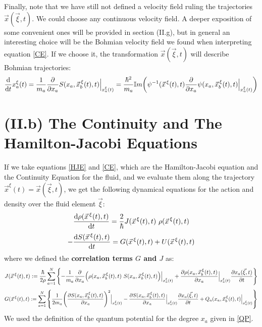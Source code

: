 \documentclass[11pt, a4paper]{article} %
\begin{document}
Finally, note that we have still not defined a velocity field ruling the trajectories $\vec{x}(\vec{\xi},t)$. We could choose any continuous velocity field. A deeper exposition of some convenient ones will be provided in section (II.g), but in general an interesting choice will be the Bohmian velocity field we found when interpreting equation \eqref{CE}. If we choose it, the transformation $\vec{x}(\vec{\xi},t)$ will describe Bohmian trajectories:
\begin{equation}\label{ImpBohm}
\dv{}{t}x_a^\xi(t)=\frac{1}{m_a}\pdv{}{x_a}S(x_a, \vec{x}_b^{\, \xi}(t),t)\Big\rvert_{x^\xi_a(t)}=\frac{\hbar^2}{m_a}\mathbb{I}m \qty( \psi^{-1}(\vec{x}^{\, \xi}(t),t)\pdv{}{x_a}\psi(x_a, \vec{x}_b^{\, \xi}(t),t)\Big\rvert_{x^\xi_a(t)})
\end{equation}

\newpage
\section*{(II.b) The Continuity and The Hamilton-Jacobi Equations\vspace{-0.3cm}}

If we take equations \eqref{HJE} and \eqref{CE}, which are the Hamilton-Jacobi equation and the Continuity Equation for the fluid, and we evaluate them along the trajectory $\vec{x}^\xi(t)=\vec{x}(\vec{\xi},t)$, we get the following dynamical equations for the action and density over the fluid element $\vec{\xi}$:
\begin{equation}\label{CE.L}
\dv{\rho(\vec{x}^{\, \xi}(t),t)}{t}=\frac{2}{\hbar}J(\vec{x}^{\, \xi}(t),t)\ \rho(\vec{x}^{\, \xi}(t),t)
\end{equation}
\begin{equation}\label{HJE.L}
-\dv{S(\vec{x}^{\, \xi}(t),t)}{t}=G(\vec{x}^{\, \xi}(t),t)+U(\vec{x}^{\, \xi}(t),t)
\end{equation}
where we defined the {\bf correlation terms $G$ and $J$} as:
\begin{equation}\label{JL}
J(\vec{x}^{\, \xi}(t),t):=\frac{\hbar}{2\rho}\sum_{a=1}^N\qty{-\frac{1}{m_a}\pdv{}{x_a}\qty(\rho(x_a, \vec{x}_b^{\, \xi}(t),t)\ S(x_a, \vec{x}_b^{\, \xi}(t),t))\Big\rvert_{x_a^\xi(t)}+\pdv{\rho(x_a, \vec{x}_b^{\, \xi}(t),t)}{x_a}\Big\rvert_{x_a^\xi(t)}\pdv{x_a(\vec{\xi},t)}{t}}
\end{equation}
\begin{equation}\label{GL}
G(\vec{x}^{\, \xi}(t),t):=\sum_{a=1}^N\qty{\frac{1}{2m_a}\qty(\pdv{S(x_a, \vec{x}_b^{\, \xi}(t),t)}{x_a})^2\Big\rvert_{x_a^\xi(t)}-\pdv{S(x_a, \vec{x}_b^{\, \xi}(t),t)}{x_a}\Big\rvert_{x_a^\xi(t)}\pdv{x_a(\vec{\xi},t)}{t}+Q_a(x_a, \vec{x}_b^{\, \xi}(t),t)\Big\rvert_{x_a^\xi(t)}}\vspace{-0.1cm}
\end{equation}
We used the definition of the quantum potential for the degree $x_a$ given in \eqref{QP}.
\end{document}
